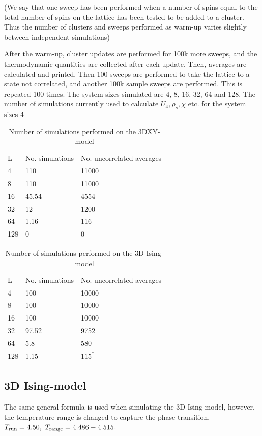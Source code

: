 (We say that one sweep has been performed when a number of spins equal to the total number of spins on the lattice has been tested to be added to a cluster.
Thus the number of clusters and sweeps performed as warm-up varies slightly between independent simulations)

After the warm-up, cluster updates are performed for 100k more sweeps, and the thermodynamic quantities are collected after each update. Then, averages are calculated and printed. Then 100 sweeps are performed to take the lattice to a state not correlated, and another 100k sample sweeps are performed. This is repeated 100 times. The system sizes simulated are 4, 8, 16, 32, 64 and 128. 
The number of simulations currently used to calculate $U_4, \rho_s, \chi $ etc. for the system sizes 4


\begin{table}[htpb]
\begin{center}
\begin{tabular}{l l l}
  L & No. simulations & No. uncorrelated averages\\
  4 & 110 & 11000\\
  8 & 110 & 11000\\
  16 & 45.54 & 4554\\
  32 & 12 & 1200\\
  64 & 1.16 & 116 \\
  128 & 0  & 0 \\
\end{tabular}
\end{center}
\caption{Number of simulations performed on the 3DXY-model}
\end{table}

\begin{table}[htpb]
\begin{center}
\begin{tabular}{l l l}
  L & No. simulations & No. uncorrelated averages\\
  4 & 100 & 10000\\
  8 & 100 & 10000\\
  16 & 100 & 10000\\
  32 & 97.52 & 9752 \\
  64 & 5.8 & 580 \\
  128 & 1.15  & $115^{*}$ \\
\end{tabular}
\end{center}
\caption{Number of simulations performed on the 3D Ising-model}
\end{table}
\subsection{3D Ising-model}
The same general formula is used when simulating the 3D Ising-model, however, the temperature range is changed to capture the phase transition, $T_{\textrm{run}} = 4.50, ~ T_{\textrm{range}} = 4.486-4.515$.

